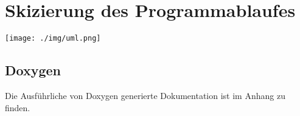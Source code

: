 \chapter{Skizierung des Programmablaufes}

\begin{minipage}{\linewidth}
\centering%
\texttt{[image: ./img/uml.png]}%
%
\label{fig:uml}%
\end{minipage}
\vspace{10px}

\section{Doxygen}

Die Ausführliche von Doxygen generierte Dokumentation ist im Anhang zu finden.



